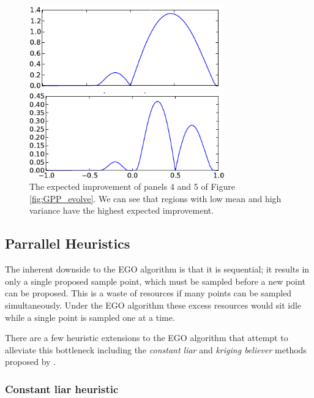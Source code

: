 \documentclass[phd,tocprelim]{cornell}
\begin{document}
\begin{figure}[hpt]
 	\centerline{\includegraphics[width=0.75\textwidth]{figures/EPI/GPP_example_EI4.png}}
    \centerline{\includegraphics[width=0.75\textwidth]{figures/EPI/GPP_example_EI.png}}
    \caption[Evolution of expected improvement of a GPP]{The expected improvement of panels 4 and 5 of Figure \ref{fig:GPP_evolve}. We can see that regions with low mean and high variance have the highest expected improvement.}
 	\label{fig:GPP_EI_evolve}
\end{figure}

\subsection{Parrallel Heuristics}

The inherent downside to the EGO algorithm is that it is sequential; it results in only a single proposed sample point, which must be sampled before a new point can be proposed. This is a waste of resources if many points can be sampled simultaneously. Under the EGO algorithm these excess resources would sit idle while a single point is sampled one at a time.

There are a few heuristic extensions to the EGO algorithm that attempt to alleviate this bottleneck including the {\it constant liar} and {\it kriging believer} methods proposed by \cite{Ginsbourger2008}.

\subsubsection{Constant liar heuristic}
\end{document}

